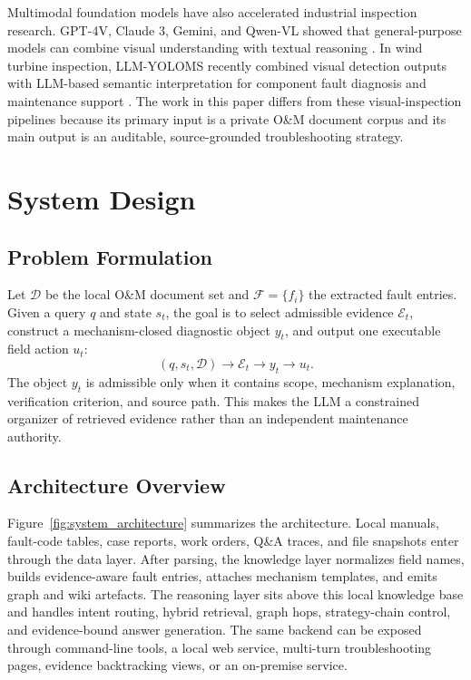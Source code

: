 \documentclass[lettersize,journal]{IEEEtran}
\begin{document}
Multimodal foundation models have also accelerated industrial inspection research. GPT-4V, Claude 3, Gemini, and Qwen-VL showed that general-purpose models can combine visual understanding with textual reasoning \cite{openai2023gpt4v,anthropic2024claude,google2023gemini,qwen2023vl}. In wind turbine inspection, LLM-YOLOMS recently combined visual detection outputs with LLM-based semantic interpretation for component fault diagnosis and maintenance support \cite{li2025llmyoloms}. The work in this paper differs from these visual-inspection pipelines because its primary input is a private O\&M document corpus and its main output is an auditable, source-grounded troubleshooting strategy.

\section{System Design}
\subsection{Problem Formulation}
Let $\mathcal{D}$ be the local O\&M document set and $\mathcal{F}=\{f_i\}$ the extracted fault entries. Given a query $q$ and state $s_t$, the goal is to select admissible evidence $\mathcal{E}_t$, construct a mechanism-closed diagnostic object $y_t$, and output one executable field action $u_t$:
\begin{equation}
(q,s_t,\mathcal{D}) \rightarrow \mathcal{E}_t \rightarrow y_t \rightarrow u_t .
\end{equation}
The object $y_t$ is admissible only when it contains scope, mechanism explanation, verification criterion, and source path. This makes the LLM a constrained organizer of retrieved evidence rather than an independent maintenance authority.

\subsection{Architecture Overview}
Figure~\ref{fig:system_architecture} summarizes the architecture. Local manuals, fault-code tables, case reports, work orders, Q\&A traces, and file snapshots enter through the data layer. After parsing, the knowledge layer normalizes field names, builds evidence-aware fault entries, attaches mechanism templates, and emits graph and wiki artefacts. The reasoning layer sits above this local knowledge base and handles intent routing, hybrid retrieval, graph hops, strategy-chain control, and evidence-bound answer generation. The same backend can be exposed through command-line tools, a local web service, multi-turn troubleshooting pages, evidence backtracking views, or an on-premise service.
\end{document}
